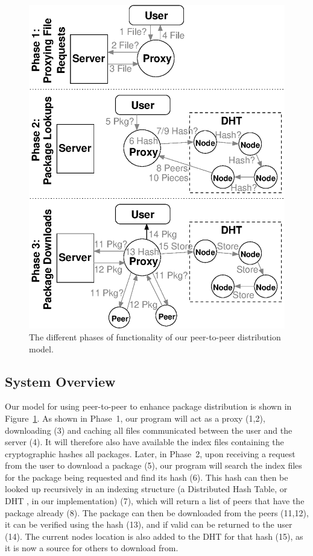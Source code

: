 \documentclass[conference]{IEEEtran}
\begin{document}
\begin{figure}
\centering
\includegraphics[width=0.9\columnwidth]{model_simple.eps}
\caption{The different phases of functionality of our peer-to-peer distribution model.}
\label{model}
\end{figure}

\subsection{System Overview}
Our model for using peer-to-peer to enhance package distribution is shown in
Figure~\ref{model}. As shown in Phase~1, our program will act as a
proxy (1,2), downloading (3) and caching all files communicated
between the user and the server (4). It will therefore also have
available the index files containing the cryptographic hashes all
packages. Later, in Phase~2, upon receiving a request from the user
to download a package (5), our program will search the index files
for the package being requested and find its hash (6). This hash can
then be looked up recursively in an indexing structure (a Distributed Hash Table, or DHT \cite{kademlia}, in our implementation) (7), which will return a
list of peers that have the package already (8). The package can
then be downloaded from the peers (11,12), it can be verified using
the hash (13), and if valid can be returned to the user (14). The
current nodes location is also added to the DHT for that hash (15),
as it is now a source for others to download from.
\end{document}

